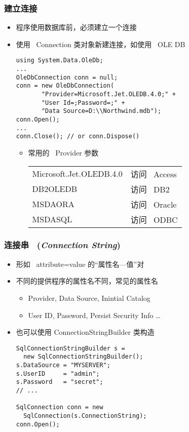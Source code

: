 \begin{frame}[fragile]
\frametitle{建立连接}
\begin{itemize}
\item 程序使用数据库前，必须建立一个连接
\item 使用 ~Connection 类对象新建连接，如使用 ~OLE DB
\begin{lstlisting}
using System.Data.OleDb;
...
OleDbConnection conn = null;
conn = new OleDbConnection(
       "Provider=Microsoft.Jet.OLEDB.4.0;" +
       "User Id=;Password=;" +
       "Data Source=D:\\Northwind.mdb");
conn.Open();
...
conn.Close(); // or conn.Dispose()
\end{lstlisting}

\begin{itemize}
\item 常用的 ~Provider 参数

\begin{tabular}{l|l}
\hline
  \small Microsoft.Jet.OLEDB.4.0 & 访问 ~Access \\
  DB2OLEDB & 访问 ~DB2 \\
  MSDAORA & 访问 ~Oracle \\
  MSDASQL & 访问 ~ODBC \\
\hline
\end{tabular}
\end{itemize}
\end{itemize}
\end{frame}

\begin{frame}[fragile]
\frametitle{连接串 ~(\textit{Connection String})}
\begin{itemize}
\item 形如 ~attribute=value 的``属性名---值''对
\item 不同的提供程序的属性名不同，常见的属性名
\begin{itemize}
\item Provider, Data Source, Inintial Catalog
\item User ID, Password, Persist Security Info \dots
\end{itemize}
\item 也可以使用 ConnectionStringBuilder 类构造
\begin{lstlisting}
SqlConnectionStringBuilder s = 
  new SqlConnectionStringBuilder();
s.DataSource = "MYSERVER";
s.UserID     = "admin";
s.Password   = "secret";
// ...

SqlConnection conn = new 
  SqlConnection(s.ConnectionString);
conn.Open();
\end{lstlisting}
\end{itemize}
\end{frame}

